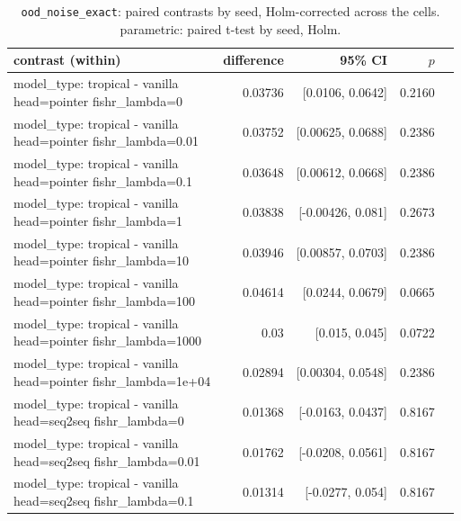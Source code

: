 \documentclass[10pt]{article}
\makeatletter
\newcommand{\stackcell}[1]{\begin{tabular}[t]{@{}l@{}}#1\end{tabular}}
\makeatother
\begin{document}
{\small
\begin{longtable}{lrrrl}
\caption{\texttt{ood\_noise\_exact}: paired contrasts by seed, Holm-corrected across the cells. parametric: paired t-test by seed, Holm.}\label{tab:paired-ood_noise_exact}\\
\toprule
contrast (within) & difference & 95\% CI & $p$ & \\
\midrule
\endhead
\stackcell{model\_type: tropical - vanilla\\\footnotesize head=pointer fishr\_lambda=0 } & 0.03736 & [0.0106, 0.0642] & 0.2160 & \\
\stackcell{model\_type: tropical - vanilla\\\footnotesize head=pointer fishr\_lambda=0.01 } & 0.03752 & [0.00625, 0.0688] & 0.2386 & \\
\stackcell{model\_type: tropical - vanilla\\\footnotesize head=pointer fishr\_lambda=0.1 } & 0.03648 & [0.00612, 0.0668] & 0.2386 & \\
\stackcell{model\_type: tropical - vanilla\\\footnotesize head=pointer fishr\_lambda=1 } & 0.03838 & [-0.00426, 0.081] & 0.2673 & \\
\stackcell{model\_type: tropical - vanilla\\\footnotesize head=pointer fishr\_lambda=10 } & 0.03946 & [0.00857, 0.0703] & 0.2386 & \\
\stackcell{model\_type: tropical - vanilla\\\footnotesize head=pointer fishr\_lambda=100 } & 0.04614 & [0.0244, 0.0679] & 0.0665 & \\
\stackcell{model\_type: tropical - vanilla\\\footnotesize head=pointer fishr\_lambda=1000 } & 0.03 & [0.015, 0.045] & 0.0722 & \\
\stackcell{model\_type: tropical - vanilla\\\footnotesize head=pointer fishr\_lambda=1e+04 } & 0.02894 & [0.00304, 0.0548] & 0.2386 & \\
\stackcell{model\_type: tropical - vanilla\\\footnotesize head=seq2seq fishr\_lambda=0 } & 0.01368 & [-0.0163, 0.0437] & 0.8167 & \\
\stackcell{model\_type: tropical - vanilla\\\footnotesize head=seq2seq fishr\_lambda=0.01 } & 0.01762 & [-0.0208, 0.0561] & 0.8167 & \\
\stackcell{model\_type: tropical - vanilla\\\footnotesize head=seq2seq fishr\_lambda=0.1 } & 0.01314 & [-0.0277, 0.054] & 0.8167 & \\

\end{longtable}}
\end{document}
